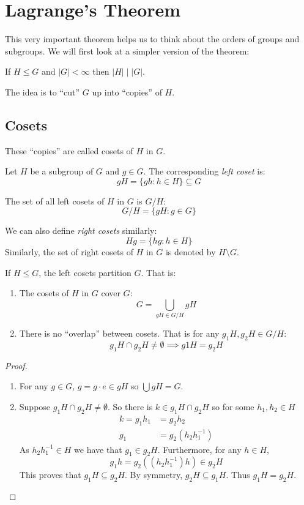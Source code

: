 \documentclass[../main.tex]{subfiles}
\begin{document}
\chapter{Lagrange's Theorem}
This very important theorem helps us to think about the orders of groups and subgroups.
We will first look at a simpler version of the theorem:
\begin{theorem}
  If $H \leq G$  and $|G| < \infty$ then $|H| \mid |G|$.
\end{theorem}
The idea is to ``cut'' $G$ up into ``copies'' of $H$.
\section{Cosets}
These ``copies'' are called cosets of $H$ in $G$.
\begin{definition}
  Let $H$ be a subgroup of $G$ and $g \in G$.
  The corresponding \textit{left coset} is:
  \[
    gH = \{gh : h \in H\} \subseteq G
  \]
\end{definition}
\begin{remark}[Notation]
  The set of all left cosets of $H$ in $G$ is $G / H$:
  \[
    G / H = \{gH : g \in G\}
  \]
\end{remark}
\begin{remark}
  We can also define \textit{right cosets} similarly:
  \[
    Hg = \{hg : h \in H\}
  \]
  Similarly, the set of right cosets of $H$ in $G$ is denoted by $H \setminus G$.
\end{remark}
\begin{lemma}
  If $H \leq G$, the left cosets partition $G$.
  That is:
  \begin{enumerate}
    \label{cosetsCover}
    \item The cosets of $H$ in $G$ cover $G$:
      \[
        G = \bigcup_{gH \in G / H} gH
      \]
    \item There is no ``overlap'' between cosets.
      That is for any $g_1H, g_2H \in G / H$:
      \[
        g_1H \cap g_2H \neq \emptyset \implies g1H = g_2H
      \]
  \end{enumerate}
\end{lemma}
\begin{proof}
  \begin{enumerate}
    \item For any $g \in G$, $g = g \cdot e \in gH$ so $\bigcup gH = G$.
    \item Suppose $g_1H \cap g_2H \neq \emptyset$.
      So there is $k \in g_1H \cap g_2H$ so for some $h_1, h_2 \in H$
      \begin{align*}
        k = g_1 h_1 &= g_2 h_2 \\
        g_1 &= g_2 (h_2 h^{-1}_{1})
      \end{align*}
      As $h_2 h^{-1}_{1} \in H$ we have that $g_1 \in g_2 H$.
      Furthermore, for any $h \in H$,
      \[
        g_1 h = g_2 ((h_2 h^{-1}_{1}) h) \in g_2 H
      \]
      This proves that $g_1H \subseteq g_2H$.
      By symmetry, $g_2 H \subseteq g_1 H$.
      Thus $g_1H = g_2H$.
  \end{enumerate}
\end{proof}
\end{document}
